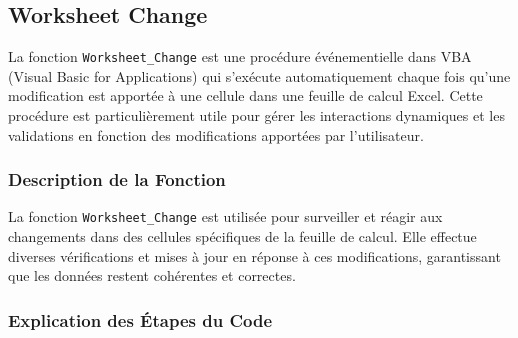 \documentclass[a4paper, oneside, 12pt, final]{extreport}
\begin{document}
\subsection{Worksheet Change}

La fonction \texttt{Worksheet\_Change} est une procédure événementielle dans VBA (Visual Basic for Applications) qui s'exécute automatiquement chaque fois qu'une modification est apportée à une cellule dans une feuille de calcul Excel. Cette procédure est particulièrement utile pour gérer les interactions dynamiques et les validations en fonction des modifications apportées par l'utilisateur.

\subsubsection{Description de la Fonction}

La fonction \texttt{Worksheet\_Change} est utilisée pour surveiller et réagir aux changements dans des cellules spécifiques de la feuille de calcul. Elle effectue diverses vérifications et mises à jour en réponse à ces modifications, garantissant que les données restent cohérentes et correctes.

\subsubsection{Explication des Étapes du Code}
\end{document}
